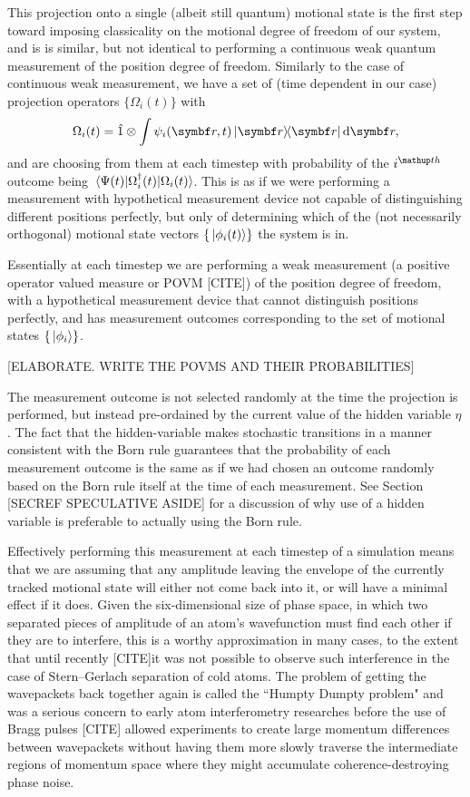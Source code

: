 This projection onto a single (albeit still quantum) motional state is the first step toward imposing classicality on the motional degree of freedom of our system, and is is similar, but not identical to performing a continuous weak quantum measurement of the position degree of freedom. Similarly to the case of continuous weak measurement, we have a set of (time dependent in our case) projection operators $\{\Omega_i(t)\}$ with
\begin{align}
\Omega_i(t) = \hat 1 \otimes \int\psi_i(\vec r, t)\ketbra{\vec r}{\vec r} \dd \vec r,
\end{align}
and are choosing from them at each timestep with probability of the $i^\up{th}$ outcome being $\matrixel{\Psi(t)}{\Omega_i^\dagger(t)}{\Omega_i(t)}$. This is as if we were performing a measurement with hypothetical measurement device not capable of distinguishing different positions perfectly, but only of determining which of the (not necessarily orthogonal) motional state vectors $\{\ket{\phi_i(t)}\}$ the system is in. 

Essentially at each timestep we are performing a weak measurement (a positive operator valued measure or POVM [CITE]) of the position degree of freedom, with a hypothetical measurement device that cannot distinguish positions perfectly, and has measurement outcomes corresponding to the set of motional states $\{\ket{\phi_i}\}$.

[ELABORATE. WRITE THE POVMS AND THEIR PROBABILITIES]

The measurement outcome is not selected randomly at the time the projection is performed, but instead pre-ordained by the current value of the hidden variable $\eta$. The fact that the hidden-variable makes stochastic transitions in a manner consistent with the Born rule guarantees that the probability of each measurement outcome is the same as if we had chosen an outcome randomly based on the Born rule itself at the time of each measurement. See Section [SECREF SPECULATIVE ASIDE] for a discussion of why use of a hidden variable is preferable to actually using the Born rule.

Effectively performing this measurement at each timestep of a simulation means that we are assuming that any amplitude leaving the envelope of the currently tracked motional state will either not come back into it, or will have a minimal effect if it does. Given the six-dimensional size of phase space, in which two separated pieces of amplitude of an atom's wavefunction must find each other if they are to interfere, this is a worthy approximation in many cases, to the extent that until recently [CITE]it was not possible to observe such interference in the case of Stern--Gerlach separation of cold atoms. The problem of getting the wavepackets back together again is called the ``Humpty Dumpty problem" and was a serious concern to early atom interferometry researches before the use of Bragg pulses [CITE] allowed experiments to create large momentum differences between wavepackets without having them more slowly traverse the intermediate regions of momentum space where they might accumulate coherence-destroying phase noise.

